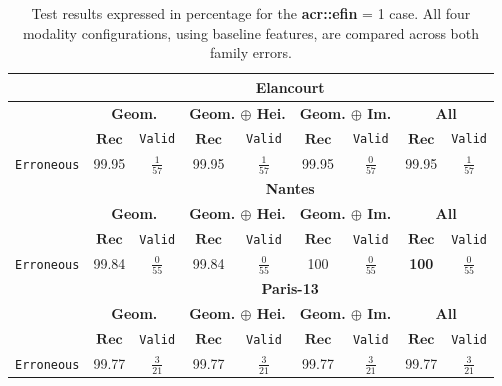         \begin{table}
            \footnotesize
            \renewcommand{\arraystretch}{1.5}
            \begin{tabular}{|c | c c | c c | c c | c c |}
                \hline
                & \multicolumn{8}{c|}{\textbf{Elancourt}}\\
                \hline
                &\multicolumn{2}{c|}{\textbf{Geom.}} & \multicolumn{2}{c|}{\textbf{Geom. \(\oplus\) Hei.}} & \multicolumn{2}{c|}{\textbf{Geom. \(\oplus\) Im.}} & \multicolumn{2}{x{2.4cm}|}{\textbf{All}}\\
                \cline{2-9}
                & \(\bm{Rec}\) & \texttt{Valid} &  \(\bm{Rec}\) & \texttt{Valid} &  \(\bm{Rec}\) & \texttt{Valid} &  \(\bm{Rec}\) & \texttt{Valid} \\
                \hline
                \texttt{Erroneous} & 99.95 & $\frac{1}{57}$ & 99.95 & $\frac{1}{57}$ & 99.95 & $\frac{0}{57}$ & 99.95 & $\frac{1}{57}$ \\
                \hline
                \hline
                & \multicolumn{8}{c|}{\textbf{Nantes}}\\
                \hline
                &\multicolumn{2}{c|}{\textbf{Geom.}} & \multicolumn{2}{c|}{\textbf{Geom. \(\oplus\) Hei.}} & \multicolumn{2}{c|}{\textbf{Geom. \(\oplus\) Im.}} & \multicolumn{2}{x{2.4cm}|}{\textbf{All}}\\
                \cline{2-9}
                & \(\bm{Rec}\) & \texttt{Valid} &  \(\bm{Rec}\) & \texttt{Valid} &  \(\bm{Rec}\) & \texttt{Valid} &  \(\bm{Rec}\) & \texttt{Valid} \\
                \hline
                \texttt{Erroneous} & 99.84 & $\frac{0}{55}$ & 99.84 & $\frac{0}{55}$ & 100 & $\frac{0}{55}$ & \textbf{100} & $\frac{0}{55}$ \\
                \hline
                \hline
                & \multicolumn{8}{c|}{\textbf{Paris-13}}\\
                \hline
                &\multicolumn{2}{c|}{\textbf{Geom.}} & \multicolumn{2}{c|}{\textbf{Geom. \(\oplus\) Hei.}} & \multicolumn{2}{c|}{\textbf{Geom. \(\oplus\) Im.}} & \multicolumn{2}{x{2.4cm}|}{\textbf{All}}\\
                \cline{2-9}
                & \(\bm{Rec}\) & \texttt{Valid} &  \(\bm{Rec}\) & \texttt{Valid} &  \(\bm{Rec}\) & \texttt{Valid} &  \(\bm{Rec}\) & \texttt{Valid} \\
                \hline
                \texttt{Erroneous} & 99.77 & $\frac{3}{21}$ & 99.77 & $\frac{3}{21}$ & 99.77 & $\frac{3}{21}$ & 99.77 & $\frac{3}{21}$ \\
                \hline
            \end{tabular}
            \renewcommand{\arraystretch}{1}
            \caption[
                Test results expressed in percentage for the \textbf{\gls{acr::efin}} = 1 case.
            ]{
                \label{tab::ablation_f1}
                Test results expressed in percentage for the \textbf{\gls{acr::efin}} = 1 case.
                All four modality configurations, using baseline features, are compared across both family errors.
            }
        \end{table}
        
